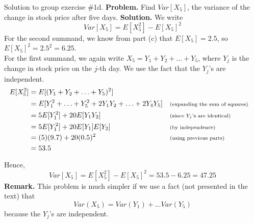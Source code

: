 \documentclass[10pt]{beamer}
\begin{document}
\begin{frame}{Solution to group exercise \#1d.}
\footnotesize
\textbf{Problem.}  Find $Var[X_5]$, the variance of the change in stock price after five days. 
\vfill \vfill 
\textbf{Solution.}   We write
  \[ Var[X_5] = E[X_5^2] - E[X_5]^2 \]
  For the second summand, we know from part (c) that $E[X_5] = 2.5$, so $ E[X_5]^2 = 2.5^2 = 6.25$. \\
   \vfill 
   For the first summand, we again write $X_5 = Y_1 + Y_2 + \hdots + Y_5$, where $Y_j$ is the change in stock price on the $j$-th day.  We use the fact that the $Y_j$'s are independent.
   \begin{align*}
   E[X_5^2] &= E[(Y_1 + Y_2 + \hdots + Y_5)^2] \\
   &=E[Y_1^2 + \hdots + Y_5^2 + 2Y_1Y_2 + \hdots +2Y_4Y_5] && \text{\scriptsize{{(expanding the sum of squares)}}}\\
   &= 5E[Y_1^2] + 20E[Y_1Y_2] && \text{\scriptsize{{(since $Y_j$'s are identical)}}}\\
   &= 5E[Y_1^2] + 20E[Y_1]E[Y_2]  && \text{\scriptsize{{(by independence)}}}\\
   &= (5)(9.7)  + 20(0.5)^2 && \text{\scriptsize{{(using previous parts)}}}\\
   &= 53.5
   \end{align*}

Hence,
  \[ Var[X_5] = E[X_5^2] - E[X_5]^2 = 53.5 - 6.25 = 47.25 \]
\vfill \vfill 
\textbf{Remark.} This problem is much simpler if we use a fact (not presented in the text) that 
\[ Var(X_5) = Var(Y_1) + \hdots Var(Y_5)\]
because the $Y_j$'s are independent.
\end{frame}
\end{document}

